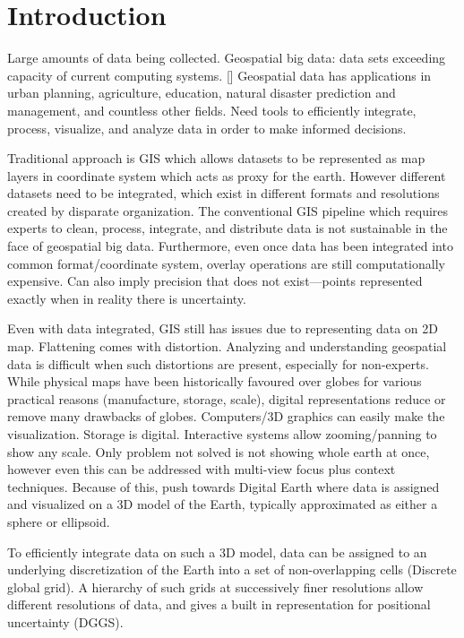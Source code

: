 \chapter{Introduction}


Large amounts of data being collected. Geospatial big data: data sets exceeding capacity of current computing systems. [] Geospatial data has applications in urban planning, agriculture, education, natural disaster prediction and management, and countless other fields. Need tools to efficiently integrate, process, visualize, and analyze data in order to make informed decisions.

Traditional approach is GIS which allows datasets to be represented as map layers in coordinate system which acts as proxy for the earth. However different datasets need to be integrated, which exist in different formats and resolutions created by disparate organization. The conventional GIS pipeline which requires experts to clean, process, integrate, and distribute data is not sustainable in the face of geospatial big data. Furthermore, even once data has been integrated into common format/coordinate system, overlay operations are still computationally expensive. Can also imply precision that does not exist---points represented exactly when in reality there is uncertainty. 

Even with data integrated, GIS still has issues due to representing data on 2D map. Flattening comes with distortion. Analyzing and understanding geospatial data is difficult when such distortions are present, especially for non-experts. While physical maps have been historically favoured over globes for various practical reasons (manufacture, storage, scale), digital representations reduce or remove many drawbacks of globes. Computers/3D graphics can easily make the visualization. Storage is digital. Interactive systems allow zooming/panning to show any scale. Only problem not solved is not showing whole earth at once, however even this can be addressed with multi-view focus plus context techniques. Because of this, push towards Digital Earth where data is assigned and visualized on a 3D model of the Earth, typically approximated as either a sphere or ellipsoid.

To efficiently integrate data on such a 3D model, data can be assigned to an underlying discretization of the Earth into a set of non-overlapping cells (Discrete global grid). A hierarchy of such grids at successively finer resolutions allow different resolutions of data, and gives a built in representation for positional uncertainty (DGGS). 


